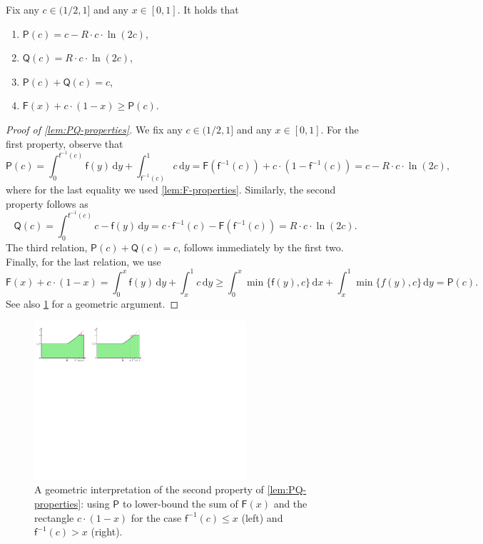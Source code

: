 \documentclass[a4paper,USenglish,cleveref]{lipics-v2019}
\newcommand{\R}{\ensuremath{R}}
\newcommand{\f}{\textsf{f}}
\newcommand{\fintegral}{\textsf{F}}
\newcommand{\water}{\textsf{Q}}
\newcommand{\cutintegral}{\textsf{P}}
\newcommand{\dd}{\mathrm{d}}
\begin{document}
\begin{lemma}
\label{lem:PQ-properties}
Fix any $c \in (1/2, 1]$ and any $x \in [0,1]$. It holds that 
\begin{enumerate}
\item $\cutintegral(c) = c - \R \cdot c \cdot \ln (2 c)$,
\item $\water(c) = \R \cdot c \cdot \ln(2 c)$, 
\item $\cutintegral(c) + \water(c) = c$,
\item $\fintegral(x) + c \cdot (1 - x) \geq \cutintegral(c)$.
\end{enumerate}
\end{lemma}


\begin{proof}[Proof of \cref{lem:PQ-properties}]
  We fix any $c \in (1/2, 1]$ and any $x \in [0, 1]$.
  For the first property, observe that 
    \[ 
      \cutintegral(c) 
        = \int_0^{\f^{-1}(c)} \f(y) \, \dd y + \int_{\f^{-1}(c)}^1 c \, \dd y 
      = \fintegral(\f^{-1}(c)) + c \cdot (1-\f^{-1}(c)) 
      = c - \R \cdot c \cdot \ln (2 c),
  \]
  where for the last equality we used \cref{lem:F-properties}.
  Similarly, the second property follows as 
  \[
    \water(c) 
      = \int_0^{\f^{-1}(c)} c - \f(y) \, \dd y
      = c \cdot \f^{-1}(c) - \fintegral(\f^{-1}(c)) = \R \cdot c \cdot \ln(2 c) .
  \]
  The third relation, $\cutintegral(c) + \water(c) = c$, follows immediately 
  by the first two. Finally, for the last relation, we use
  \[
    \fintegral(x) + c \cdot (1 - x)
      = \int_0^{x} \f(y) \, \dd y + \int_{x}^1 c \, \dd y 
      \geq \int_0^{x} \min\{\f(y),c\} \, \dd x + \int_{x}^1 \min\{f(y), c\} \, \dd y 
      = \cutintegral(c).
  \]
  See also \cref{fig:F-vs-cutintegral} for a geometric argument.
  \end{proof}
    
\begin{figure}[t]
    \centering
    \includegraphics[width=0.7\textwidth]{images/obs.pdf}
    \caption{A geometric interpretation of the second property of \cref{lem:PQ-properties}:
    using $\cutintegral$ to lower-bound the sum of $\fintegral(x)$ and the rectangle $c \cdot (1-x)$
      for the case $\f^{-1}(c) \leq x$ (left) and $\f^{-1}(c) > x$ (right).}
    \label{fig:F-vs-cutintegral}
\end{figure}
  
\end{document}
